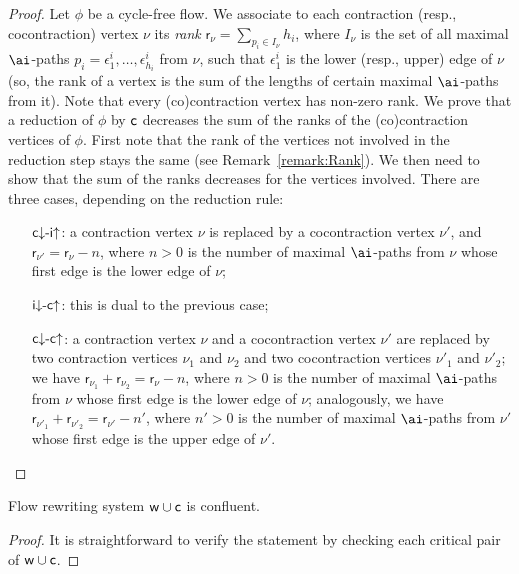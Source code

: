 \newcommand{\rk}{{\mathsf r}}
\begin{proof}
Let $\phi$ be a cycle-free flow. We associate to each contraction (resp., cocontraction) vertex $\nu$ its \emph{rank} $\rk_\nu=\sum_{p_i\in I_\nu}h_i$, where $I_\nu$ is the set of all maximal $\ai$-paths $p_i=\epsilon^i_1,\dots,\epsilon^i_{h_i}$ from $\nu$, such that $\epsilon^i_1$ is the lower (resp., upper) edge of $\nu$ (so, the rank of a vertex is the sum of the lengths of certain maximal $\ai$-paths from it). Note that every (co)contraction vertex has non-zero rank. We prove that a reduction of $\phi$ by ${\mathsf c}$ decreases the sum of the ranks of the (co)contraction vertices of $\phi$. First note that the rank of the vertices not involved in the reduction step stays the same (see Remark~\vref{remark:Rank}). We then need to show that the sum of the ranks decreases for the vertices involved. There are three cases, depending on the reduction rule:
\begin{itemize}
%
\item[${{\mathsf c}{\downarrow}{\hbox{-}}{\mathsf i}{\uparrow }}$:]a contraction vertex $\nu$ is replaced by a cocontraction vertex $\nu'$, and $\rk_{\nu'}=\rk_\nu-n$, where $n>0$ is the number of maximal $\ai$-paths from $\nu$ whose first edge is the lower edge of $\nu$;
%
\item[${{\mathsf i}{\downarrow}{\hbox{-}}{\mathsf c}{\uparrow }}$:]this is dual to the previous case;
%
\item[${{\mathsf c}{\downarrow}{\hbox{-}}{\mathsf c}{\uparrow }}$:]a contraction vertex $\nu$ and a cocontraction vertex $\nu'$ are replaced by two contraction vertices $\nu_1$ and $\nu_2$ and two cocontraction vertices $\nu'_1$ and $\nu'_2$; we have $\rk_{\nu_1}+\rk_{\nu_2}=\rk_\nu-n$, where $n>0$ is the number of maximal $\ai$-paths from $\nu$ whose first edge is the lower edge of $\nu$; analogously, we have $\rk_{\nu'_1}+\rk_{\nu'_2}=\rk_{\nu'}-n'$, where $n'>0$ is the number of maximal $\ai$-paths from $\nu'$ whose first edge is the upper edge of $\nu'$.
\end{itemize}
\end{proof}

\begin{theorem}\label{theorem:RewritingSystemContractionWeakeningConfluent}
Flow rewriting system\/ ${\mathsf w}\cup{\mathsf c}$ is confluent.
\end{theorem}

\begin{proof}
It is straightforward to verify the statement by checking each critical pair of ${\mathsf w}\cup{\mathsf c}$.
\end{proof}

